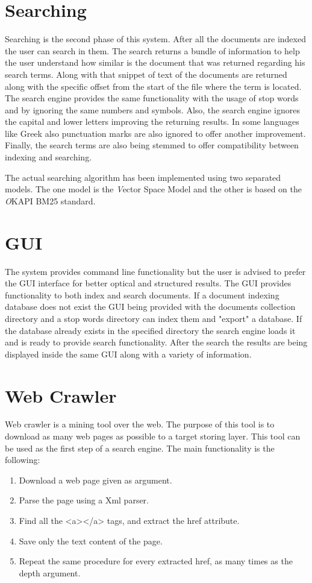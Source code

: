 \documentclass[letterpaper,twocolumn,10pt]{article}
\begin{document}
\section{Searching}
Searching is the second phase of this system. After all the documents are indexed the user can search in them. The search returns a bundle of information to help the user understand how similar is the document that was returned regarding his search terms. Along with that snippet of text of the documents are returned along with the specific offset from the start of the file where the term is located. The search engine provides the same functionality with the usage of stop words and by ignoring the same numbers and symbols. Also, the search engine ignores the capital and lower letters improving the returning results. In some languages like Greek also punctuation marks are also ignored to offer another improvement. Finally, the search terms are also being stemmed to offer compatibility between indexing and searching.

The actual searching algorithm has been implemented using two separated models. The one model is the {\emph Vector Space} Model and the other is based on the {\emph OKAPI BM25} standard.

\section{GUI}
The system provides command line functionality but the user is advised to prefer the GUI interface for better optical and structured results. The GUI provides functionality to both index and search documents. If a document indexing database does not exist the GUI being provided with the documents collection directory and a stop words directory can index them and "export" a database. If the database already exists in the specified directory the search engine loads it and is ready to provide search functionality. After the search the results are being displayed inside the same GUI along with a variety of information.

\section{Web Crawler}
Web crawler is a mining tool over the web. The purpose of this tool is to download as many web pages as possible to a target storing layer. This tool can be used as the first step of a search engine. The main functionality is the following:
\begin{enumerate}
  \item Download a web page given as argument.
  \item Parse the page using a Xml parser.
  \item Find all the <a></a> tags, and extract the href attribute.
  \item Save only the text content of the page.
  \item Repeat the same procedure for every extracted href, as many times as the depth argument.
\end{enumerate}
\end{document}
